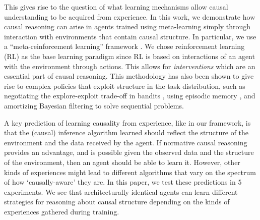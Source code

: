 
This gives rise to the question of what learning mechanisms allow causal understanding to be acquired from experience. In this work, we demonstrate how causal reasoning can arise in agents trained using meta-learning
simply through interaction with environments that contain causal structure. In particular, we use a ``meta-reinforcement learning'' framework \citep{duan2016RL2,wang2016}. We chose reinforcement learning (RL) as the base learning paradigm since RL is based on interactions of an agent with the environment through actions. This allows for \textit{interventions} which are an essential part of causal reasoning. This methodology has also been shown to give rise to complex policies that exploit structure in the task distribution, such as negotiating the explore-exploit trade-off in bandits \citep{wang2016, wang2018}, using episodic memory \citep{ritter2018been}, and amortizing Bayesian filtering to solve sequential problems\citep{ortega2019meta}.

A key prediction of learning causality from experience, like in our framework, is that the (causal) inference algorithm learned should reflect the structure of the environment and the data received by the agent. If normative causal reasoning provides an advantage, and is possible given the observed data and the structure of the environment, then an agent should be able to learn it. However, other kinds of experiences might lead to different algorithms that vary on the spectrum of how `causally-aware' they are. In this paper, we test these predictions in 5 experiments. We see that architecturally identical agents can learn different strategies for reasoning about causal structure depending on the kinds of experiences gathered during training. 



